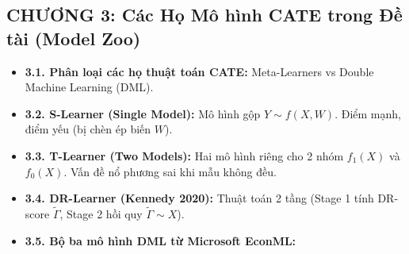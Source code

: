 \subsection*{CHƯƠNG 3: Các Họ Mô hình CATE trong Đề tài (Model Zoo)}
\begin{itemize}[leftmargin=*]
    \item \textbf{3.1. Phân loại các họ thuật toán CATE:} Meta-Learners vs Double Machine Learning (DML).
    \item \textbf{3.2. S-Learner (Single Model):} Mô hình gộp $Y \sim f(X, W)$. Điểm mạnh, điểm yếu (bị chèn ép biến $W$).
    \item \textbf{3.3. T-Learner (Two Models):} Hai mô hình riêng cho 2 nhóm $f_1(X)$ và $f_0(X)$. Vấn đề nổ phương sai khi mẫu không đều.
    \item \textbf{3.4. DR-Learner (Kennedy 2020):} Thuật toán 2 tầng (Stage 1 tính DR-score $\tilde{\Gamma}$, Stage 2 hồi quy $\tilde{\Gamma} \sim X$).
    \item \textbf{3.5. Bộ ba mô hình DML từ Microsoft EconML:}
\end{itemize}

